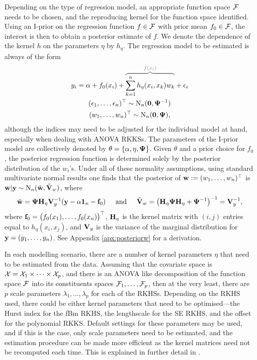 Depending on the type of regression model, an appropriate function space  ${\mathcal F}$ needs to be chosen, and the reproducing kernel for the function space identified.
Using an I-prior on the regression function $f\in{\mathcal F}$ with prior mean $f_0\in{\mathcal F}$, the interest is then to obtain a posterior estimate of $f$.
We denote the dependence of the kernel $h$ on the parameters $\eta$ by $h_\eta$.
The regression model to be estimated is always of the form
\begin{align}\label{eq:model2}
  \begin{gathered}
    y_i = \alpha + f_0(x_i) +
    {\color{gray}
    \overbrace{\color{black}
    \sum_{k=1}^n h_\eta(x_i,x_k)w_k 
    }^{f(x_i)}
    }
    + \epsilon_i \\
    (\epsilon_1,\dots,\epsilon_n)^\top \sim \N_n(\bzero, \bPsi^{-1}) \\
    (w_1,\dots,w_n)^\top \sim \N_n(\bzero,\bPsi),
  \end{gathered}
\end{align}
although the indices may need to be adjusted for the individual model at hand, especially when dealing with ANOVA RKKSs.
The parameters of the I-prior model are collectively denoted by $\theta = \{\alpha,\eta,{\bm\Psi} \}$.
Given $\theta$ and a prior choice for $f_0$, the posterior regression function is determined solely by the posterior distribution of the $w_i$'s.
Under all of these normality assumptions, using standard multivariate normal results one finds that the posterior of ${\mathbf w} := (w_1,\dots,w_n)^\top$ is ${\mathbf w}|{\mathbf y} \sim \operatorname{N}_n(\tilde{\mathbf w}, \tilde{{\mathbf V}}_w )$, where
\begin{align}\label{eq:posteriorw}
  \begin{gathered}
    \tilde{\mathbf w} = {\bm\Psi} {\mathbf H}_\eta {\mathbf V}_y^{-1} ({\mathbf y} - \alpha{\mathbf 1}_n - {\mathbf f}_0)
    \hspace{0.5cm}\text{and}\hspace{0.5cm}
    \tilde{{\mathbf V}}_w = \big({\mathbf H}_\eta{\bm\Psi}{\mathbf H}_\eta + {\bm\Psi}^{-1}\big)^{-1} = {\mathbf V}_y^{-1},
  \end{gathered}
\end{align}
where ${\mathbf f}_0=\big(f_0(x_1),\dots,f_0(x_n) \big)^\top$, ${\mathbf H}_\eta$ is the kernel matrix with $(i,j)$ entries equal to $h_\eta(x_i,x_j)$, and ${\mathbf V}_y$ is the variance of the marginal distribution for ${\mathbf y} = (y_1,\dots,y_n)$.
See Appendix \ref{apx:posteriorw} for a derivation.

In each modelling scenario, there are a number of kernel parameters $\eta$ that need to be estimated from the data.
Assuming that the covariate space is ${\mathcal X} = {\mathcal X}_1\times\cdots\times{\mathcal X}_p$, and there is an ANOVA like decomposition of the function space ${\mathcal F}$ into its constituents spaces ${\mathcal F}_1,\dots,{\mathcal F}_p$, then at the very least, there are $p$ scale parameters $\lambda_1,\dots,\lambda_p$ for each of the RKHSs.
Depending on the RKHS used, there could be either kernel parameters that need to be optimised---the Hurst index for the fBm RKHS, the lengthscale for the SE RKHS, and the offset for the polynomial RKKS.
Default settings for these parameters may be used, and if this is the case, only scale parameters need to be estimated, and the estimation procedure can be made more efficient as the kernel matrices need not be recomputed each time.
This is explained in further detail in .


